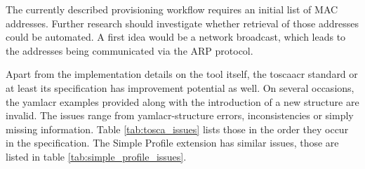 The currently described provisioning workflow requires an initial list of MAC addresses. Further research should investigate whether retrieval of those addresses could be automated. A first idea would be a network broadcast, which leads to the addresses being communicated via the ARP protocol.

Apart from the implementation details on the tool itself, the \gls{toscaacr} standard or at least its specification has improvement potential as well. On several occasions, the \gls{yamlacr} examples provided along with the introduction of a new structure are invalid. The issues range from \gls{yamlacr}-structure errors, inconsistencies or simply missing information. Table \ref{tab:tosca_issues} lists those in the order they occur in the specification. The Simple Profile extension has similar issues, those are listed in table \ref{tab:simple_profile_issues}.


